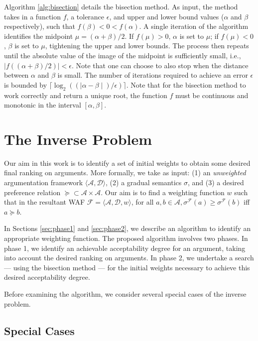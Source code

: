 \documentclass{article}
\newcommand{\AF}{\mathcal{F}}
\newcommand{\A}{\mathcal{A}}
\newcommand{\D}{\mathcal{D}}
\begin{document}
Algorithm \ref{alg:bisection} details the bisection method. As input, the method takes in a function $f$, a tolerance $\epsilon$, and upper and lower bound values ($\alpha$ and $\beta$ respectively), such that $f(\beta)<0<f(\alpha)$. A single iteration of the algorithm identifies the midpoint $\mu=(\alpha+\beta)/2$. If $f(\mu)>0$, $\alpha$ is set to $\mu$; if $f(\mu)<0$, $\beta$ is set to $\mu$, tightening the upper and lower bounds. The process then repeats until the absolute value of the image of the midpoint is sufficiently small, i.e., $|f((\alpha+\beta)/2)|<\epsilon$. 
%
Note that one can choose to also stop when the distance between $\alpha$ and $\beta$ is small.
%
The number of iterations required to achieve an error $\epsilon$ is bounded by $\lceil \log_2((\mid\alpha-\beta\mid)/\epsilon) \rceil$. 
%
Note that for the bisection method to work correctly and return a unique root, the function $f$ must be continuous and monotonic in the interval $[\alpha,\beta]$.

\section{The Inverse Problem} \label{sec:inverseProb}

Our aim in this work is to identify a set of initial weights to obtain some desired final ranking on arguments. More formally, we take as input: (1) an \textit{unweighted} argumentation framework $\langle \A,\D \rangle$, (2) a gradual semantics $\sigma$, and (3) a desired preference relation $\succeq \subset \A \times \A$. 
%
Our aim is to find a weighting function $w$ such that in the resultant WAF $\AF=\langle \A,\D,w \rangle$, for all $a,b \in \A, \sigma^\AF(a) \geq \sigma^\AF(b)$ iff $a \succeq b$.

In Sections \ref{sec:phase1} and \ref{sec:phase2}, we describe an algorithm to identify an appropriate weighting function. The proposed algorithm involves two phases. In phase 1, we identify an achievable acceptability degree for an argument, taking into account the desired ranking on arguments. In phase 2, we undertake a search --- using the bisection method --- for the initial weights necessary to achieve this desired acceptability degree.

Before examining the algorithm, we consider several special cases of the inverse problem.

\subsection{Special Cases}
\end{document}
